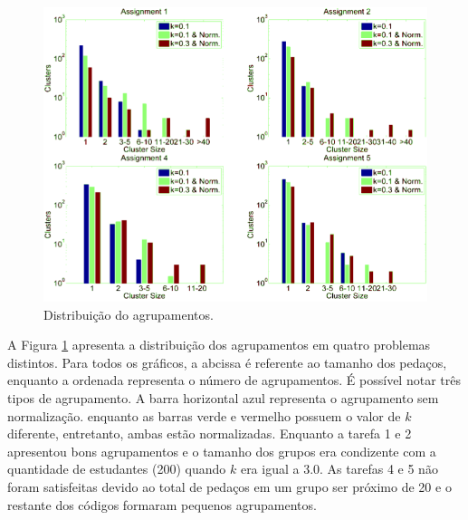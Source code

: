 		\begin{figure}
			\centering
			\includegraphics[width=0.7\linewidth]{imagem/clusteringPerformance}
			\captionsetup{justification=centering}
			\caption{Distribuição do agrupamentos.}
			\label{fig:clusteringPerformance}
		\end{figure}
	    
		
		A Figura \ref{fig:clusteringPerformance} apresenta a distribuição dos
		agrupamentos em quatro problemas distintos. Para todos os gráficos, a
		abcissa é referente ao tamanho dos pedaços, enquanto a ordenada representa
		o número de agrupamentos. É possível notar três tipos de agrupamento. A barra
		horizontal azul representa o agrupamento sem normalização. enquanto as barras
		verde e vermelho possuem o valor de $k$ diferente, entretanto, ambas estão
		normalizadas. Enquanto a tarefa 1 e 2 apresentou bons agrupamentos e o tamanho
		dos grupos era condizente com a quantidade de estudantes (200) quando $k$ era
		igual a 3.0. As tarefas 4 e 5 não foram satisfeitas devido ao total de pedaços
		em um grupo ser próximo de 20 e o restante dos códigos formaram pequenos
		agrupamentos.
				
